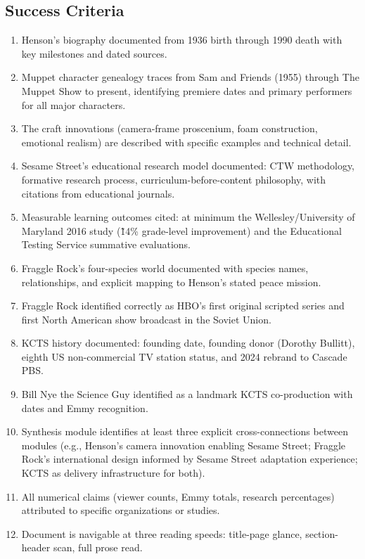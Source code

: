 \documentclass[11pt,letterpaper]{article}
\begin{document}
\subsection{Success Criteria}

\begin{enumerate}[leftmargin=*]
  \item Henson's biography documented from 1936 birth through 1990 death with key milestones and dated sources.
  \item Muppet character genealogy traces from Sam and Friends (1955) through The Muppet Show to present, identifying premiere dates and primary performers for all major characters.
  \item The craft innovations (camera-frame proscenium, foam construction, emotional realism) are described with specific examples and technical detail.
  \item Sesame Street's educational research model documented: CTW methodology, formative research process, curriculum-before-content philosophy, with citations from educational journals.
  \item Measurable learning outcomes cited: at minimum the Wellesley/University of Maryland 2016 study (\~14\% grade-level improvement) and the Educational Testing Service summative evaluations.
  \item Fraggle Rock's four-species world documented with species names, relationships, and explicit mapping to Henson's stated peace mission.
  \item Fraggle Rock identified correctly as HBO's first original scripted series and first North American show broadcast in the Soviet Union.
  \item KCTS history documented: founding date, founding donor (Dorothy Bullitt), eighth US non-commercial TV station status, and 2024 rebrand to Cascade PBS.
  \item Bill Nye the Science Guy identified as a landmark KCTS co-production with dates and Emmy recognition.
  \item Synthesis module identifies at least three explicit cross-connections between modules (e.g., Henson's camera innovation enabling Sesame Street; Fraggle Rock's international design informed by Sesame Street adaptation experience; KCTS as delivery infrastructure for both).
  \item All numerical claims (viewer counts, Emmy totals, research percentages) attributed to specific organizations or studies.
  \item Document is navigable at three reading speeds: title-page glance, section-header scan, full prose read.
\end{enumerate}
\end{document}
